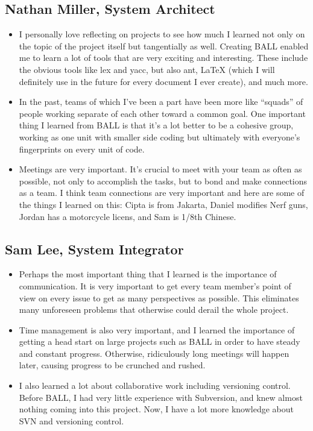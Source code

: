 \subsection{Nathan Miller, System Architect}
\begin{itemize}
\item I personally love reflecting on projects to see how much I learned not only on the topic of the project itself but tangentially as well. Creating BALL enabled me to learn a lot of tools that are very exciting and interesting. These include the obvious tools like lex and yacc, but also ant, LaTeX (which I will definitely use in the future for every document I ever create), and much more.
\item In the past, teams of which I've been a part have been more like ``squads'' of people working separate of each other toward a common goal. One important thing I learned from BALL is that it's a lot better to be a cohesive group, working as one unit with smaller side coding but ultimately with everyone's fingerprints on every unit of code. 
\item Meetings are very important. It's crucial to meet with your team
  as often as possible, not only to accomplish the tasks, but to bond
  and make connections as a team. I think team connections are very
  important and here are some of the things I learned on this: Cipta
  is from Jakarta, Daniel modifies Nerf guns, Jordan has a motorcycle
  licens, and Sam is 1/8th Chinese.
\end{itemize}
\subsection{Sam Lee, System Integrator}
\begin{itemize}
\item Perhaps the most important thing that I learned is the importance of communication. It is very important to get every team member's point of view on every issue to get as many perspectives as possible. This eliminates many unforeseen problems that otherwise could derail the whole project.
\item Time management is also very important, and I learned the importance of getting a head start on large projects such as BALL in order to have steady and constant progress. Otherwise, ridiculously long meetings will happen later, causing progress to be crunched and rushed.
\item I also learned a lot about collaborative work including versioning control. Before BALL, I had very little experience with Subversion, and knew almost nothing coming into this project. Now, I have a lot more knowledge about SVN and versioning control.
\end{itemize}
